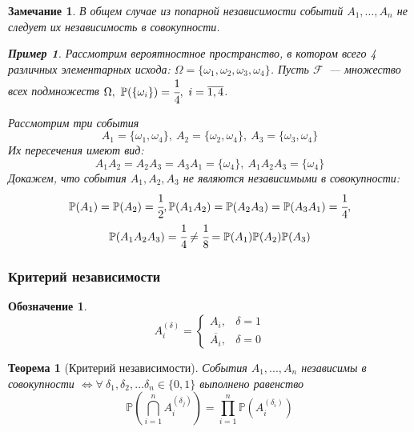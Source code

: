 \documentclass[oneside,final,14pt]{extreport}
\newcommand\myprob[1]{{\mathbb{P}(#1)}}
\newtheorem{thm}{Теорема}[section]
\newtheorem*{rmrk}{Замечание}
\newtheorem*{symb}{Обозначение}
\theoremstyle{definition}
\newtheorem*{exmp}{Пример}
\begin{document}
\begin{rmrk}
    В общем случае из попарной независимости событий $A_1, \ldots, A_n$ не следует их независимость в совокупности.
    \begin{exmp}
        Рассмотрим вероятностное пространство, в котором всего 4 различных элементарных исхода: $\Omega = \{ \omega_1, \omega_2, \omega_3, \omega_4 \}$. Пусть $\mathcal{F}$~--- множество всех подмножеств $\Omega,~\myprob{\{\omega_i\}} = \cfrac{1}{4},~i = \overline{1,4}$.
        
        Рассмотрим три события 
        \begin{equation*}
            A_1 = \{ \omega_1, \omega_4 \},~ 
            A_2 = \{ \omega_2, \omega_4 \},~
            A_3 = \{ \omega_3, \omega_4 \}
        \end{equation*}
        Их пересечения имеют вид:
        \begin{equation*}
            A_1A_2 = A_2A_3 = A_3A_1 = \{ \omega_4 \},~
            A_1A_2A_3 = \{ \omega_4 \}
        \end{equation*}
        Докажем, что события $A_1, A_2, A_3$ не являются независимыми в совокупности:
        \begin{gather*}
            \myprob{A_1} = \myprob{A_2} = \cfrac{1}{2}, \myprob{A_1A_2} = \myprob{A_2A_3} = \myprob{A_3A_1} = \cfrac{1}{4}, \\ \myprob{A_1A_2A_3} = \cfrac{1}{4} \neq \cfrac{1}{8} = \myprob{A_1}\myprob{A_2}\myprob{A_3}
        \end{gather*}
    \end{exmp}
\end{rmrk}

\subsubsection{Критерий независимости}

\begin{symb}
    \begin{equation*}
        A_{i}^{(\delta)}=\left\{\begin{array}{ll}A_{i}, & \delta=1 \\ \overline{A_{i}}, & \delta=0\end{array}\right.
    \end{equation*}
\end{symb}

\begin{thm}[Критерий независимости]
    События $A_1, ..., A_n$ независимы в совокупности $\Leftrightarrow \forall ~ \delta_1, \delta_2, ... \delta_n \in \{0, 1\}$ выполнено равенство
    \begin{equation*}
        \myprob{\bigcap_{i=1}^{n} A_{i}^{\left(\delta_{j}\right)}}=\prod_{i=1}^{n}\myprob{A_{i}^{\left(\delta_{i}\right)}}
    \end{equation*}
\end{thm}
\end{document}
